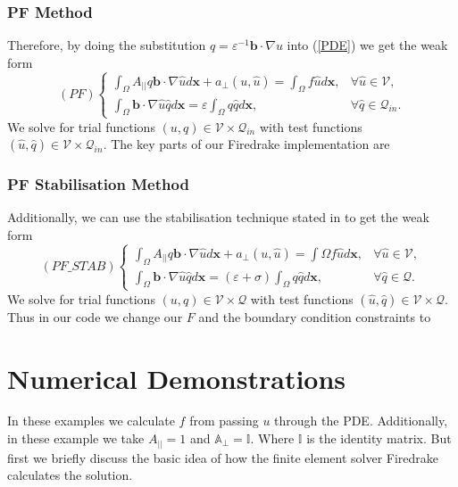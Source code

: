 \documentclass[12pt]{ociamthesis}
\begin{document}
\subsection{PF Method}
Therefore, by doing the substitution $q=\varepsilon^{-1} \mathbf{b} \cdot \nabla u$ into (\ref{PDE}) we get the weak form
\begin{equation} \label{PF_w}
(PF)
\begin{cases}
\int_{\Omega}A_{||}q\mathbf{b} \cdot \nabla \hat{u}  d\mathbf{x} + a_{\perp}(u, \hat{u}) 
= \int_{\Omega} f \hat{u} d\mathbf{x},
&\forall \hat{u} \in \mathcal{V},\\
\int_{\Omega}\mathbf{b} \cdot \nabla \hat{u}\hat{q} d\mathbf{x} 
= \varepsilon \int_{\Omega}q\hat{q} d \mathbf{x}, 
&\forall \hat{q} \in \mathcal{Q}_{in}.
\end{cases}
\end{equation}
We solve for trial functions $(u,q) \in \mathcal{V} \times \mathcal{Q}_{in}$ with test functions $(\hat{u}, \hat{q}) \in \mathcal{V} \times \mathcal{Q}_{in}$. The key parts of our  Firedrake \cite{Dragon} implementation are


\subsection{PF Stabilisation Method}
Additionally, we can use the stabilisation technique stated in \cite{STAB} to get the weak form
\begin{equation} \label{PF_STAB_w}
(PF\_STAB)
\begin{cases}
\int_{\Omega}A_{||}q\mathbf{b} \cdot \nabla \hat{u}  d\mathbf{x} + a_{\perp}(u, \hat{u}) 
= \int{\Omega} f \hat{u} d\mathbf{x},
&\forall \hat{u} \in \mathcal{V},\\
\int_{\Omega}\mathbf{b} \cdot \nabla \hat{u}\hat{q} d\mathbf{x} 
= (\varepsilon + \sigma)\int_{\Omega}q\hat{q} d \mathbf{x}, 
&\forall \hat{q} \in \mathcal{Q}.
\end{cases}
\end{equation}
We solve for trial functions $(u,q) \in \mathcal{V} \times \mathcal{Q}$ with test functions $(\hat{u}, \hat{q}) \in \mathcal{V} \times \mathcal{Q}$. Thus in our code we change our $F$ and the boundary condition constraints to


\chapter{Numerical Demonstrations}
In these examples we calculate $f$ from passing $u$ through the PDE. Additionally, in these example we take $A_{||}=1$ and $\mathbb{A}_{\perp} = \mathbb{I}$. Where $\mathbb{I}$ is the identity matrix. But first we briefly discuss the basic idea of how the finite element solver Firedrake \cite{Dragon} calculates the solution. 
\end{document}
